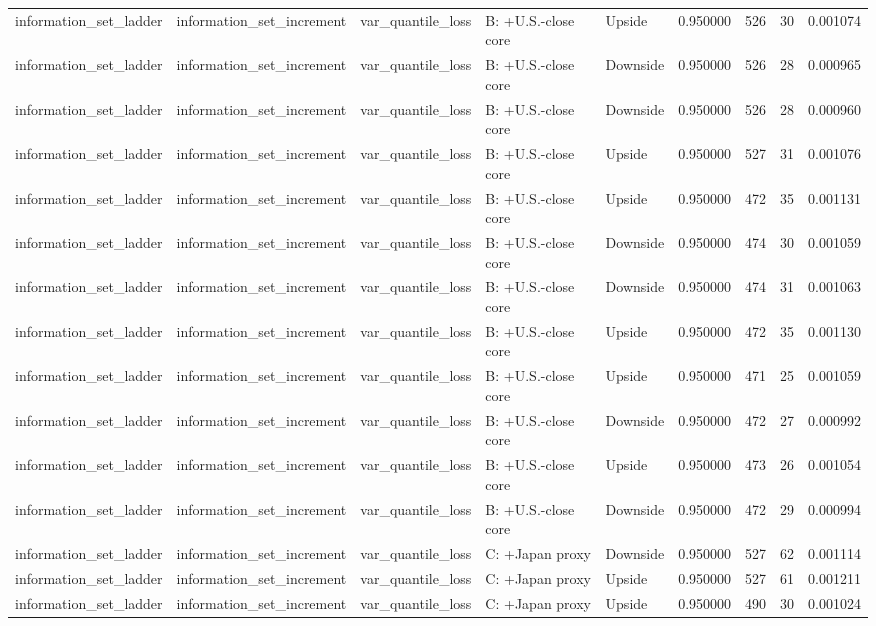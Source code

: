\begin{tabular}{lllllrrr}
information\_set\_ladder & information\_set\_increment & var\_quantile\_loss & B: +U.S.-close core & Upside & 0.950000 & 526 & 30 & 0.001074 \\
information\_set\_ladder & information\_set\_increment & var\_quantile\_loss & B: +U.S.-close core & Downside & 0.950000 & 526 & 28 & 0.000965 \\
information\_set\_ladder & information\_set\_increment & var\_quantile\_loss & B: +U.S.-close core & Downside & 0.950000 & 526 & 28 & 0.000960 \\
information\_set\_ladder & information\_set\_increment & var\_quantile\_loss & B: +U.S.-close core & Upside & 0.950000 & 527 & 31 & 0.001076 \\
information\_set\_ladder & information\_set\_increment & var\_quantile\_loss & B: +U.S.-close core & Upside & 0.950000 & 472 & 35 & 0.001131 \\
information\_set\_ladder & information\_set\_increment & var\_quantile\_loss & B: +U.S.-close core & Downside & 0.950000 & 474 & 30 & 0.001059 \\
information\_set\_ladder & information\_set\_increment & var\_quantile\_loss & B: +U.S.-close core & Downside & 0.950000 & 474 & 31 & 0.001063 \\
information\_set\_ladder & information\_set\_increment & var\_quantile\_loss & B: +U.S.-close core & Upside & 0.950000 & 472 & 35 & 0.001130 \\
information\_set\_ladder & information\_set\_increment & var\_quantile\_loss & B: +U.S.-close core & Upside & 0.950000 & 471 & 25 & 0.001059 \\
information\_set\_ladder & information\_set\_increment & var\_quantile\_loss & B: +U.S.-close core & Downside & 0.950000 & 472 & 27 & 0.000992 \\
information\_set\_ladder & information\_set\_increment & var\_quantile\_loss & B: +U.S.-close core & Upside & 0.950000 & 473 & 26 & 0.001054 \\
information\_set\_ladder & information\_set\_increment & var\_quantile\_loss & B: +U.S.-close core & Downside & 0.950000 & 472 & 29 & 0.000994 \\
information\_set\_ladder & information\_set\_increment & var\_quantile\_loss & C: +Japan proxy & Downside & 0.950000 & 527 & 62 & 0.001114 \\
information\_set\_ladder & information\_set\_increment & var\_quantile\_loss & C: +Japan proxy & Upside & 0.950000 & 527 & 61 & 0.001211 \\
information\_set\_ladder & information\_set\_increment & var\_quantile\_loss & C: +Japan proxy & Upside & 0.950000 & 490 & 30 & 0.001024 \\

\end{tabular}
